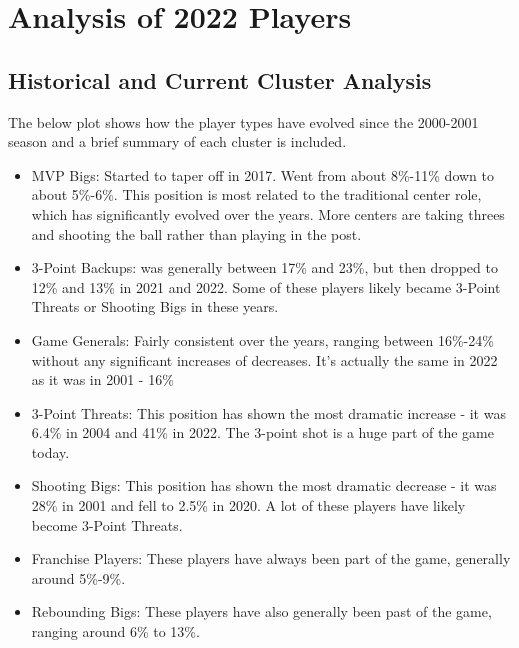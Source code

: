 \documentclass[
]{article}
\providecommand{\tightlist}{%
  \setlength{\itemsep}{0pt}\setlength{\parskip}{0pt}}
\begin{document}
\hypertarget{analysis-of-2022-players}{%
\section{Analysis of 2022 Players}\label{analysis-of-2022-players}}

\hypertarget{historical-and-current-cluster-analysis}{%
\subsection{Historical and Current Cluster
Analysis}\label{historical-and-current-cluster-analysis}}

The below plot shows how the player types have evolved since the
2000-2001 season and a brief summary of each cluster is included.

\begin{itemize}
\tightlist
\item
  MVP Bigs: Started to taper off in 2017. Went from about 8\%-11\% down
  to about 5\%-6\%. This position is most related to the traditional
  center role, which has significantly evolved over the years. More
  centers are taking threes and shooting the ball rather than playing in
  the post.
\item
  3-Point Backups: was generally between 17\% and 23\%, but then dropped
  to 12\% and 13\% in 2021 and 2022. Some of these players likely became
  3-Point Threats or Shooting Bigs in these years.
\item
  Game Generals: Fairly consistent over the years, ranging between
  16\%-24\% without any significant increases of decreases. It's
  actually the same in 2022 as it was in 2001 - 16\%
\item
  3-Point Threats: This position has shown the most dramatic increase -
  it was 6.4\% in 2004 and 41\% in 2022. The 3-point shot is a huge part
  of the game today.
\item
  Shooting Bigs: This position has shown the most dramatic decrease - it
  was 28\% in 2001 and fell to 2.5\% in 2020. A lot of these players
  have likely become 3-Point Threats.
\item
  Franchise Players: These players have always been part of the game,
  generally around 5\%-9\%.
\item
  Rebounding Bigs: These players have also generally been past of the
  game, ranging around 6\% to 13\%.
\end{itemize}
\end{document}

